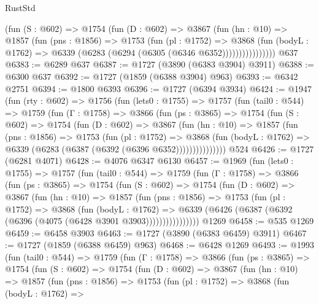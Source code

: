 \begin{lexlean}{RustStd}
\begin{coremodule}
                (fun (S : @602) =>
                @1754
                  (fun (D : @602) =>
                  @3867
                    (fun (hn : @10) =>
                    @1857
                      (fun (pns : @1856) =>
                      @1753
                        (fun (pl : @1752) =>
                        @3868
                          (fun (bodyL : @1762) =>
                          @6339 (@6283 (@6294 (@6305 (@6346 @6352))))))))))))))))
    @637
@6383 := @6289 @637
@6387 := @1727 (@3890 (@6383 @3904) @3911)
@6388 := @6300 @637
@6392 := @1727 (@1859 (@6388 @3904) @963)
@6393 := @6342 @2751
@6394 := @1800 @6393
@6396 := @1727 (@6394 @3934)
@6424 := @1947
    (fun (rty : @602) =>
    @1756
      (fun (lets0 : @1755) =>
      @1757
        (fun (tail0 : @544) =>
        @1759
          (fun (Γ : @1758) =>
          @3866
            (fun (ps : @3865) =>
            @1754
              (fun (S : @602) =>
              @1754
                (fun (D : @602) =>
                @3867
                  (fun (hn : @10) =>
                  @1857
                    (fun (pns : @1856) =>
                    @1753
                      (fun (pl : @1752) =>
                      @3868
                        (fun (bodyL : @1762) =>
                        @6339 (@6283 (@6387 (@6392 (@6396 @6352)))))))))))))))
    @524
@6426 := @1727 (@6281 @4071)
@6428 := @4076 @6347 @6130
@6457 := @1969
    (fun (lets0 : @1755) =>
    @1757
      (fun (tail0 : @544) =>
      @1759
        (fun (Γ : @1758) =>
        @3866
          (fun (ps : @3865) =>
          @1754
            (fun (S : @602) =>
            @1754
              (fun (D : @602) =>
              @3867
                (fun (hn : @10) =>
                @1857
                  (fun (pns : @1856) =>
                  @1753
                    (fun (pl : @1752) =>
                    @3868
                      (fun (bodyL : @1762) =>
                      @6339 (@6426 (@6387 (@6392 (@6396 (@4075 (@6428 @3901 @3903))))))))))))))))
    @1269
@6458 := @535 @1269
@6459 := @6458 @3903
@6463 := @1727 (@3890 (@6383 @6459) @3911)
@6467 := @1727 (@1859 (@6388 @6459) @963)
@6468 := @6428 @1269
@6493 := @1993
    (fun (tail0 : @544) =>
    @1759
      (fun (Γ : @1758) =>
      @3866
        (fun (ps : @3865) =>
        @1754
          (fun (S : @602) =>
          @1754
            (fun (D : @602) =>
            @3867
              (fun (hn : @10) =>
              @1857
                (fun (pns : @1856) =>
                @1753
                  (fun (pl : @1752) =>
                  @3868
                    (fun (bodyL : @1762) =>

\end{coremodule}
\end{lexlean}
